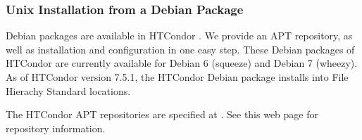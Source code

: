 
\subsubsection{\label{sec:install-debs}
Unix Installation from a Debian Package}

Debian packages are available in HTCondor \VersionNotice.
We provide an APT repository, as well as 
installation and configuration in one easy step.
These Debian packages of HTCondor are currently available for 
Debian 6 (squeeze) and Debian 7 (wheezy).
As of HTCondor version 7.5.1, 
the HTCondor Debian package installs into File Hierachy Standard locations.

The HTCondor APT repositories are specified at
  .
See this web page for repository information.

